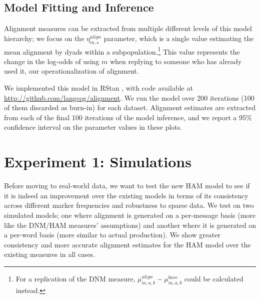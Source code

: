 \documentclass{acm_proc_article-sp}
\begin{document}
\subsection{Model Fitting and Inference}
Alignment measures can be extracted from multiple different levels of this model hierarchy; we focus on the $\eta^{align}_{m,s}$ parameter, which is a single value estimating the mean alignment by dyads within a subpopulation.\footnote{For a replication of the DNM measure, $\mu^{align}_{m,a,b}-\mu^{base}_{m,a,b}$ could be calculated instead.}  This value represents the change in the log-odds of using $m$ when replying to someone who has already used it, our operationalization of alignment.

We implemented this model in RStan \cite{Stan}, with code available at \url{http://github.com/langcog/alignment}. We run the model over 200 iterations (100 of them discarded as burn-in) for each dataset.  Alignment estimates are extracted from each of the final 100 iterations of the model inference, and we report a 95\% confidence interval on the parameter values in these plots.



\section{Experiment 1: Simulations}
Before moving to real-world data, we want to test the new HAM model to see if it is indeed an improvement over the existing models in terms of its consistency across different marker frequencies and robustness to sparse data.  We test on two simulated models; one where alignment is generated on a per-message basis (more like the DNM/HAM measures' assumptions) and another where it is generated on a per-word basis (more similar to actual production).  We show greater consistency and more accurate alignment estimates for the HAM model over the existing measures in all cases.
\end{document}
